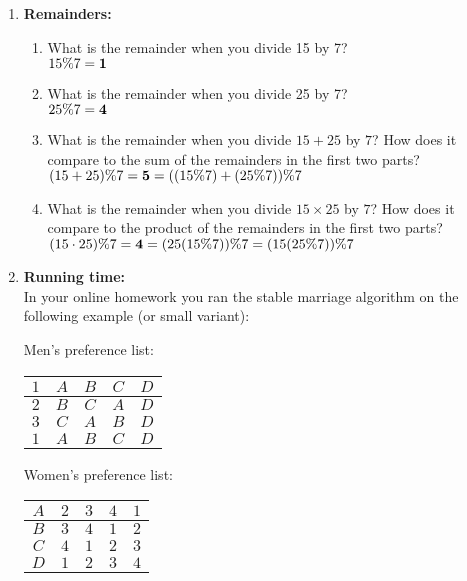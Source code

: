 \documentclass[11pt,fleqn]{article}
\begin{document}
\begin{enumerate}
\newpage
\item {\bf Remainders:}
\begin{enumerate}
\item What is the remainder when you divide 15 by 7? \\
$15 \% 7 = {\bf 1}$
\item What is the remainder when you divide 25 by 7? \\
$25 \% 7 = {\bf 4}$
\item What is the remainder when you divide $15 + 25$ by $7$? How does it compare to the sum of the remainders in the first two parts? \\
$(15+25)\%7 = {\bf 5} = ((15\%7)+(25\%7))\%7$
\item What is the remainder when you divide $15 \times 25$ by $7$? How does it compare to the product of the remainders in the first two parts? \\
$(15 \cdot 25) \% 7 = {\bf 4} = (25(15\%7))\%7 = (15(25\%7))\%7$
\end{enumerate}

\newpage
\item {\bf Running time:}\\
In your online homework you ran the stable marriage algorithm on the following example (or small variant):

Men's preference list:
\begin{center}
\begin{tabular}{|c||c|c|c|c|}
\hline
$1$     & $A$     & $B$ & $C$ & $D$ \\ 
\hline 
$2$     & $B$     & $C$ & $A$ & $D$ \\
\hline
$3$     & $C$     & $A$ & $B$ & $D$ \\
\hline
$1$     & $A$     & $B$ & $C$ & $D$ \\ 
\hline
\end{tabular}
\end{center}

Women's preference list:
\begin{center}
\begin{tabular}{|c||c|c|c|c|}
\hline
$A$     & $2$     & $3$ & $4$ & $1$ \\ 
\hline 
$B$     & $3$     & $4$ & $1$ & $2$ \\
\hline
$C$     & $4$     & $1$ & $2$ & $3$ \\
\hline
$D$     & $1$     & $2$ & $3$ & $4$ \\ 
\hline
\end{tabular}
\end{center}


\end{enumerate}
\end{document}
